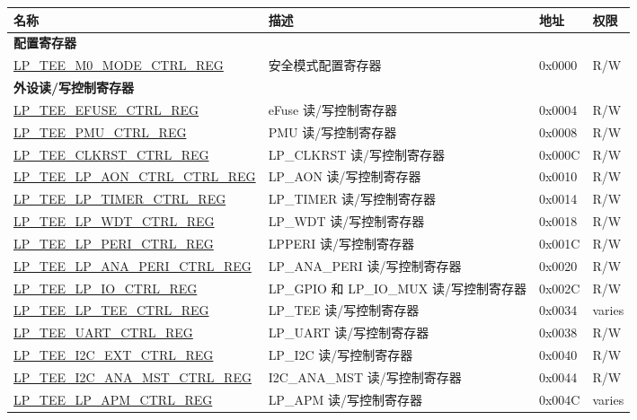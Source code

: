 \begin{longtable}{ | l | l | p{2.2cm} | p{1cm} | }
\hline\rowcolor{lightgray}
\textbf{名称} & \textbf{描述} &  \textbf{地址} & \textbf{权限} \\ \hline
\endhead
\multicolumn{4}{|l|}{\textbf{配置寄存器}} \\ \hline
\hyperref[regdesc:LPTEEM0MODECTRLREG]{LP\_TEE\_M0\_MODE\_CTRL\_REG} & 安全模式配置寄存器 & 0x0000 & R/W \\ \hline
\multicolumn{4}{|l|}{\textbf{外设读/写控制寄存器}} \\ \hline
\hyperref[regdesc:LPTEEEFUSECTRLREG]{LP\_TEE\_EFUSE\_CTRL\_REG} & eFuse 读/写控制寄存器 & 0x0004 & R/W \\ \hline
\hyperref[regdesc:LPTEEPMUCTRLREG]{LP\_TEE\_PMU\_CTRL\_REG} & PMU 读/写控制寄存器 & 0x0008 & R/W \\ \hline
\hyperref[regdesc:LPTEECLKRSTCTRLREG]{LP\_TEE\_CLKRST\_CTRL\_REG} & LP\_CLKRST 读/写控制寄存器 & 0x000C & R/W \\ \hline
\hyperref[regdesc:LPTEELPAONCTRLREG]{LP\_TEE\_LP\_AON\_CTRL\_CTRL\_REG} & LP\_AON 读/写控制寄存器 & 0x0010 & R/W \\ \hline
\hyperref[regdesc:LPTEELPTIMERCTRLREG]{LP\_TEE\_LP\_TIMER\_CTRL\_REG} & LP\_TIMER 读/写控制寄存器 & 0x0014 & R/W \\ \hline
\hyperref[regdesc:LPTEELPWDTCTRLREG]{LP\_TEE\_LP\_WDT\_CTRL\_REG} & LP\_WDT 读/写控制寄存器 & 0x0018 & R/W \\ \hline
\hyperref[regdesc:LPTEELPPERICTRLREG]{LP\_TEE\_LP\_PERI\_CTRL\_REG} & LPPERI 读/写控制寄存器 & 0x001C & R/W \\ \hline
\hyperref[regdesc:LPTEELPANAPERICTRLREG]{LP\_TEE\_LP\_ANA\_PERI\_CTRL\_REG} & LP\_ANA\_PERI 读/写控制寄存器 & 0x0020 & R/W \\ \hline
\hyperref[regdesc:LPTEELPIOCTRLREG]{LP\_TEE\_LP\_IO\_CTRL\_REG} & LP\_GPIO 和 LP\_IO\_MUX 读/写控制寄存器 & 0x002C & R/W \\ \hline
\hyperref[regdesc:LPTEELPTEECTRLREG]{LP\_TEE\_LP\_TEE\_CTRL\_REG} & LP\_TEE 读/写控制寄存器 & 0x0034 & varies \\ \hline
\hyperref[regdesc:LPTEEUARTCTRLREG]{LP\_TEE\_UART\_CTRL\_REG} & LP\_UART 读/写控制寄存器 & 0x0038 & R/W \\ \hline
\hyperref[regdesc:LPTEEI2CEXTCTRLREG]{LP\_TEE\_I2C\_EXT\_CTRL\_REG} & LP\_I2C 读/写控制寄存器 & 0x0040 & R/W \\ \hline
\hyperref[regdesc:LPTEEI2CANAMSTCTRLREG]{LP\_TEE\_I2C\_ANA\_MST\_CTRL\_REG} & I2C\_ANA\_MST 读/写控制寄存器 & 0x0044 & R/W \\ \hline
\hyperref[regdesc:LPTEELPAPMCTRLREG]{LP\_TEE\_LP\_APM\_CTRL\_REG} & LP\_APM 读/写控制寄存器 & 0x004C & varies \\ \hline


\end{longtable}
